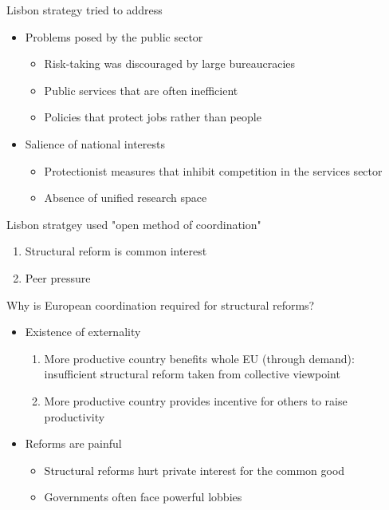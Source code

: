 \documentclass{beamer}
\begin{document}
\begin{frame}
  Lisbon strategy tried to address 
  \begin{itemize}
  \item Problems posed by the public sector
  \begin{itemize}
    \item Risk-taking was discouraged by large bureaucracies
    \item Public services that are often inefficient
    \item Policies that protect jobs rather than people
  \end{itemize}
  \medskip
  \item Salience of national interests
  \begin{itemize}
    \item Protectionist measures that inhibit competition in the services sector
    \item Absence of unified research space
  \end{itemize}
\end{itemize}
\end{frame}

\begin{frame}
  Lisbon stratgey used "open method of coordination"
  \begin{enumerate}
    \item Structural reform is common interest
    \item Peer pressure
  \end{enumerate}
\end{frame}

\begin{frame}
  Why is European coordination required for structural reforms?
  \medskip
  \begin{itemize}
    \item Existence of externality
    \begin{enumerate}
      \item More productive country benefits whole EU (through demand): insufficient structural reform taken from collective viewpoint
      \item More productive country provides incentive for others to raise productivity
    \end{enumerate}
    \medskip
    \item Reforms are painful
    \begin{itemize}
      \item Structural reforms hurt private interest for the common good
      \item Governments often face powerful lobbies
    \end{itemize}
  \end{itemize}
\end{frame}
\end{document}
